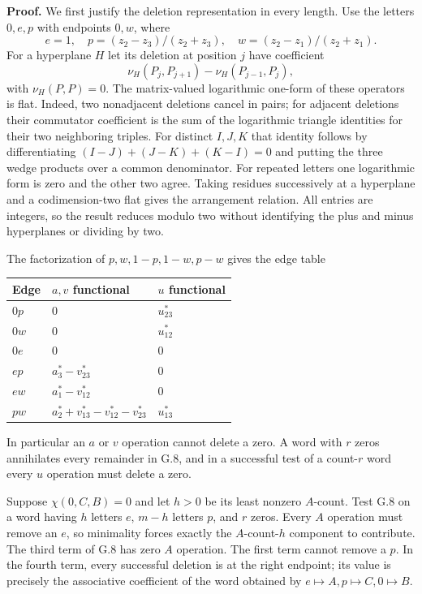 \documentclass[10pt,a4paper]{article}
\begin{document}
\textbf{Proof.} We first justify the deletion representation in every length. Use the letters \(0,e,p\) with endpoints \(0,w\), where \[
e=1,\quad p=(z_2-z_3)/(z_2+z_3),\quad
w=(z_2-z_1)/(z_2+z_1).
\] For a hyperplane \(H\) let its deletion at position \(j\) have coefficient \[
\nu_H(P_j,P_{j+1})-\nu_H(P_{j-1},P_j),
\] with \(\nu_H(P,P)=0\). The matrix-valued logarithmic one-form of these operators is flat. Indeed, two nonadjacent deletions cancel in pairs; for adjacent deletions their commutator coefficient is the sum of the logarithmic triangle identities for their two neighboring triples. For distinct \(I,J,K\) that identity follows by differentiating \((I-J)+(J-K)+(K-I)=0\) and putting the three wedge products over a common denominator. For repeated letters one logarithmic form is zero and the other two agree. Taking residues successively at a hyperplane and a codimension-two flat gives the arrangement relation. All entries are integers, so the result reduces modulo two without identifying the plus and minus hyperplanes or dividing by two.

The factorization of \(p,w,1-p,1-w,p-w\) gives the edge table

\begin{longtable}[]{@{}lll@{}}
\toprule\noalign{}
Edge & \(a,v\) functional & \(u\) functional \\
\midrule\noalign{}
\endhead
\bottomrule\noalign{}
\endlastfoot
\(0p\) & \(0\) & \(u_{23}^*\) \\
\(0w\) & \(0\) & \(u_{12}^*\) \\
\(0e\) & \(0\) & \(0\) \\
\(ep\) & \(a_3^*-v_{23}^*\) & \(0\) \\
\(ew\) & \(a_1^*-v_{12}^*\) & \(0\) \\
\(pw\) & \(a_2^*+v_{13}^*-v_{12}^*-v_{23}^*\) & \(u_{13}^*\) \\
\end{longtable}

In particular an \(a\) or \(v\) operation cannot delete a zero. A word with \(r\) zeros annihilates every remainder in G.8, and in a successful test of a count-\(r\) word every \(u\) operation must delete a zero.

Suppose \(\chi(0,C,B)=0\) and let \(h>0\) be its least nonzero \(A\)-count. Test G.8 on a word having \(h\) letters \(e\), \(m-h\) letters \(p\), and \(r\) zeros. Every \(A\) operation must remove an \(e\), so minimality forces exactly the \(A\)-count-\(h\) component to contribute. The third term of G.8 has zero \(A\) operation. The first term cannot remove a \(p\). In the fourth term, every successful deletion is at the right endpoint; its value is precisely the associative coefficient of the word obtained by \(e\mapsto A,p\mapsto C,0\mapsto B\).
\end{document}
